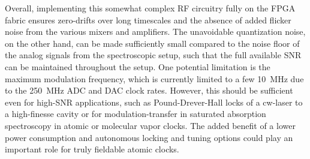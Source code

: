 \documentclass[aip,graphicx]{revtex4-2}
\begin{document}
	Overall, implementing this somewhat complex RF circuitry fully on the FPGA fabric ensures zero-drifts over long timescales and the absence of added flicker noise from the various mixers and amplifiers. The unavoidable quantization noise, on the other hand, can be made sufficiently small compared to the noise floor of the analog signals from the spectroscopic setup, such that the full available SNR can be maintained throughout the setup. One potential limitation is the maximum modulation frequency, which is currently limited to a few 10~MHz due to the 250~MHz ADC and DAC clock rates. However, this should be sufficient even for high-SNR applications, such as Pound-Drever-Hall locks of a cw-laser to a high-finesse cavity or for modulation-transfer in saturated absorption spectroscopy in atomic or molecular vapor clocks. The added benefit of a lower power consumption and autonomous locking and tuning options could play an important role for truly fieldable atomic clocks.
	
\end{document}
